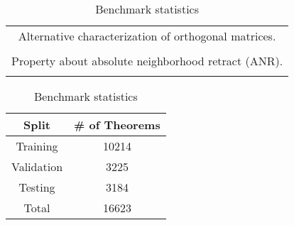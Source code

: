 \documentclass{article}
\begin{document}
\begin{table}[b]
\begin{minipage}{.6\linewidth} \centering
\caption{Examples of theorems in the benchmark (compressed for brevity)}
\label{table:holistexamples}
\begin{tabular}{|c|}
\hline
  Alternative characterization of orthogonal matrices.\\
   \\
\hline
  Property about absolute neighborhood retract (ANR).\\
   \\
\hline
\end{tabular}
\end{minipage}
\hspace{0.05\linewidth}
\begin{minipage}{.3\linewidth} \centering
\caption{Benchmark statistics}
\label{table:holiststats}
\begin{tabular}{|c|c|}
\hline
Split      & \# of Theorems \\
\hline
Training   & 10214 \\
Validation & 3225 \\
Testing    & 3184 \\
\hline
Total      & 16623 \\
\hline
\end{tabular}
\end{minipage}
\end{table}
\end{document}
